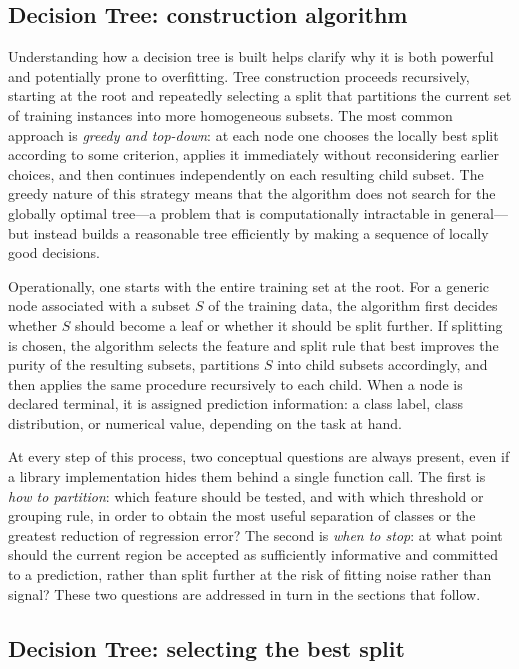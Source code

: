 \subsection*{Decision Tree: construction algorithm}

Understanding how a decision tree is built helps clarify why it is both powerful and
potentially prone to overfitting. Tree construction proceeds recursively, starting at the
root and repeatedly selecting a split that partitions the current set of training instances
into more homogeneous subsets. The most common approach is \emph{greedy and top-down}: at
each node one chooses the locally best split according to some criterion, applies it
immediately without reconsidering earlier choices, and then continues independently on each
resulting child subset. The greedy nature of this strategy means that the algorithm does not
search for the globally optimal tree---a problem that is computationally intractable in
general---but instead builds a reasonable tree efficiently by making a sequence of locally
good decisions.

Operationally, one starts with the entire training set at the root. For a generic node
associated with a subset $S$ of the training data, the algorithm first decides whether $S$
should become a leaf or whether it should be split further. If splitting is chosen, the
algorithm selects the feature and split rule that best improves the purity of the resulting
subsets, partitions $S$ into child subsets accordingly, and then applies the same procedure
recursively to each child. When a node is declared terminal, it is assigned prediction
information: a class label, class distribution, or numerical value, depending on the task at
hand.

At every step of this process, two conceptual questions are always present, even if a
library implementation hides them behind a single function call. The first is \emph{how to
partition}: which feature should be tested, and with which threshold or grouping rule, in
order to obtain the most useful separation of classes or the greatest reduction of regression
error? The second is \emph{when to stop}: at what point should the current region be
accepted as sufficiently informative and committed to a prediction, rather than split further
at the risk of fitting noise rather than signal? These two questions are addressed in turn
in the sections that follow.

\subsection*{Decision Tree: selecting the best split}

